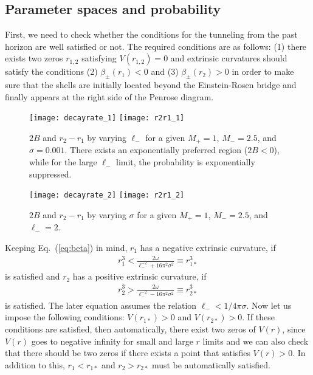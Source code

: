 \documentclass[preprintnumbers,10pt,nofootinbib]{revtex4}
\begin{document}
\subsection{Parameter spaces and probability}

First, we need to check whether the conditions for the tunneling from the past horizon are well satisfied or not. The required conditions are as follows: (1) there exists two zeros $r_{1,2}$ satisfying $V(r_{1,2}) = 0$ and extrinsic curvatures should satisfy the conditions (2) $\beta_{\pm}(r_{1}) < 0$ and (3) $\beta_{\pm}(r_{2}) > 0$ in order to make sure that the shells are initially located beyond the Einstein-Rosen bridge and finally appears at the right side of the Penrose diagram.

\begin{figure}
\begin{center}
\texttt{[image: decayrate\_1]}
\texttt{[image: r2r1\_1]}
\caption{\label{fig:1}$2B$ and $r_{2} - r_{1}$ by varying $\ell_{-}$ for a given $M_{+} = 1$, $M_{-} = 2.5$, and $\sigma = 0.001$. There exists an exponentially preferred region ($2B < 0$), while for the large $\ell_{-}$ limit, the probability is exponentially suppressed.}
\texttt{[image: decayrate\_2]}
\texttt{[image: r2r1\_2]}
\caption{\label{fig:2}$2B$ and $r_{2} - r_{1}$ by varying $\sigma$ for a given $M_{+} = 1$, $M_{-} = 2.5$, and $\ell_{-} = 2$.}
\end{center}
\end{figure}

Keeping Eq.~(\ref{eq:beta}) in mind, $r_{1}$ has a negative extrinsic curvature, if
\begin{eqnarray}
r_{1}^{3} < \frac{2\omega}{\ell_{-}^{-2} + 16\pi^{2} \sigma^{2}} \equiv r_{1*}^{3}
\end{eqnarray}
is satisfied and $r_{2}$ has a positive extrinsic curvature, if
\begin{eqnarray}
r_{2}^{3} > \frac{2\omega}{\ell_{-}^{-2} - 16\pi^{2} \sigma^{2}} \equiv r_{2*}^{3}
\end{eqnarray}
is satisfied. The later equation assumes the relation $\ell_{-} < 1/4\pi\sigma$. Now let us impose the following conditions: $V(r_{1*}) > 0$ and $V(r_{2*}) > 0$. If these conditions are satisfied, then automatically, there exist two zeros of $V(r)$, since $V(r)$ goes to negative infinity for small and large $r$ limits and we can also check that there should be two zeros if there exists a point that satisfies $V(r) > 0$. In addition to this, $r_{1} < r_{1*}$ and $r_{2} > r_{2*}$ must be automatically satisfied.
\end{document}
